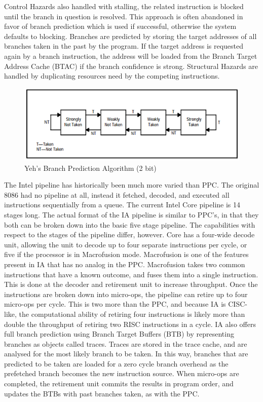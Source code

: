 \documentclass[10pt]{article}
\begin{document}
\par
Control Hazards also handled with stalling, the related instruction is blocked until the branch in question is resolved. This approach is often  abandoned in favor of branch prediction which is used if successful, otherwise the system defaults to blocking. Branches are predicted by storing the target addresses of all branches taken in the past by the program. If the target address is requested again by a branch instruction, the address will be loaded from the Branch Target Address Cache (BTAC) if the branch confidence is strong. Structural Hazards are handled by duplicating resources need by the competing instructions. 
\par
\begin{figure}[h]
   \centering
   \includegraphics[scale=0.5]{PPC_branch}
   \caption{Yeh's Branch Prediction Algorithm (2 bit)}
\end{figure}
\par
The Intel pipeline has historically been much more varied than PPC. The original 8086 had no pipeline at all, instead it fetched, decoded, and executed all instructions sequentially from a queue. The current Intel Core pipeline is 14 stages long. The actual format of the IA pipeline is similar to PPC’s, in that they both can be broken down into the basic five stage pipeline. The capabilities with respect to the stages of the pipeline differ, however. Core has a four-wide decode unit, allowing the unit to decode up to four separate instructions per cycle, or five if the processor is in Macrofusion mode. Macrofusion is one of the features present in IA that has no analog in the PPC. Macrofusion takes two common instructions that have a known outcome, and fuses them into a single instruction. This is done at the decoder and retirement unit to increase throughput. Once the instructions are broken down into micro-ops, the pipeline can retire up to four micro-ops per cycle. This is two more than the PPC, and because IA is CISC-like, the computational ability of retiring four instructions is likely more than double the throughput of retiring two RISC instructions in a cycle.  IA also offers full branch prediction using Branch Target Buffers (BTB) by representing branches as objects called traces. Traces are stored in the trace cache, and are analysed for the most likely branch to be taken. In this way, branches that are predicted to be taken are loaded for a zero cycle branch overhead as the prefetched branch becomes the new instruction source. When micro-ops are completed, the retirement unit commits the results in program order, and updates the BTBs with past branches taken, as with the PPC. 
\end{document}
